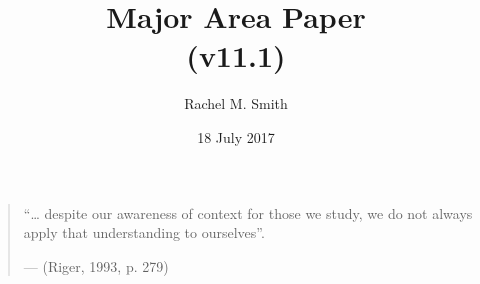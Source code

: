 \documentclass[11pt,]{tufte-book}
\title{Major Area Paper\\
(v11.1)}
\author{Rachel M. Smith}
\date{18 July 2017}
\begin{document}
\maketitle



{
\setcounter{tocdepth}{1}
\tableofcontents
}

\makeatletter
\def\LT@makenoprefixcaption#1#2#3{%
  \LT@mcol\LT@cols c{\hbox to\z@{\hss\parbox[t]\LTcapwidth{
    \sbox\@tempboxa{#1{}#3}
    \ifdim\wd\@tempboxa>\hsize
      #1{}#3
    \else
      \hbox to\hsize{\hfil\box\@tempboxa\hfil}%
    \fi
    \endgraf\vskip\baselineskip}
  \hss}}}
\makeatother

\makeatletter
\let\LT@oldmakecaption=\LT@makecaption
\let\oldthetable=\thetable
\let\oldtheHtable=\theHtable
\makeatother

\makeatletter
{}
\newenvironment{no-prefix-table-caption}{
  \let\LT@makecaption=\LT@makenoprefixcaption
  \renewcommand\thetable{x.\thetableno}
  \renewcommand\theHtable{x.\thetableno}
  \stepcounter{tableno}
}{
  \let\thetable=\oldthetable
  \let\theHtable=\oldtheHtable
  \let\LT@makecaption=\LT@oldmakecaption
  \addtocounter{table}{-1}
}
\makeatother

\newpage

\newcommand{\plusnamesingular}{}
\newcommand{\starnamesingular}{}
\newcommand{\xrefname}[1]{\protect\renewcommand{\plusnamesingular}{#1}}
\newcommand{\Xrefname}[1]{\protect\renewcommand{\starnamesingular}{#1}}
\providecommand{\cref}{\plusnamesingular~\ref}
\providecommand{\Cref}{\starnamesingular~\ref}
\providecommand{\crefformat}[2]{}
\providecommand{\Crefformat}[2]{}

\crefformat{figure}{Figure~#2#1#3}
\Crefformat{figure}{Figure~#2#1#3}
\crefformat{table}{Table~#2#1#3}
\Crefformat{table}{Table~#2#1#3}

\doublespacing

\chapter{}\label{section}

\begin{quote}
``\ldots{} despite our awareness of context for those we study, we do
not always apply that understanding to ourselves''.

\hfill --- (Riger, 1993, p. 279)
\end{quote}
\end{document}
